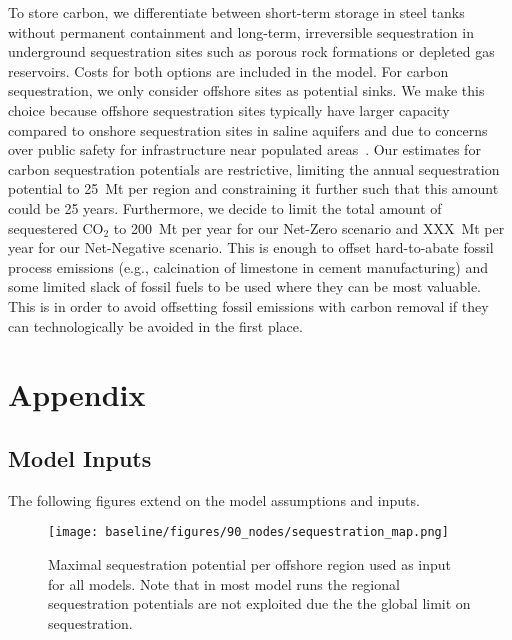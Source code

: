 \documentclass[twocolumn]{article}
\newcommand{\COtwo}{CO$_2$}
\begin{document}

To store carbon, we differentiate between short-term storage in steel tanks without permanent containment and long-term, irreversible sequestration in underground sequestration sites such as porous rock formations or depleted gas reservoirs.
Costs for both options are included in the model.
For carbon sequestration, we only consider offshore sites as potential sinks.
We make this choice because offshore sequestration sites typically have larger capacity compared to onshore sequestration sites in saline aquifers and due to concerns over public safety for infrastructure near populated areas~\cite{TODO}.
Our estimates for carbon sequestration potentials are restrictive, limiting the annual sequestration potential to 25~Mt per region and constraining it further such that this amount could be  25 years.
Furthermore, we decide to limit the total amount of sequestered \COtwo{} to 200~Mt per year for our Net-Zero scenario and XXX~Mt per year for our Net-Negative scenario.
This is enough to offset hard-to-abate fossil process emissions (e.g., calcination of limestone in cement manufacturing) and some limited slack of fossil fuels to be used where they can be most valuable.
This is in order to avoid offsetting fossil emissions with carbon removal if they can technologically be avoided in the first place.


\printbibliography

\newpage
\appendix
\setcounter{section}{0}
\renewcommand{\thesection}{\Alph{section}}
\renewcommand{\thefigure}{\Alph{section}.\arabic{figure}} %

\onecolumn %

\section*{Appendix}

\subsection{Model Inputs}

The following figures extend on the model assumptions and inputs.

\begin{figure}
    \centering
    \texttt{[image: baseline/figures/90\_nodes/sequestration\_map.png]}
    \caption{Maximal sequestration potential per offshore region used as input for all models. Note that in most model runs the regional sequestration potentials are not exploited due the the global limit on sequestration.}
\end{figure}
\end{document}
